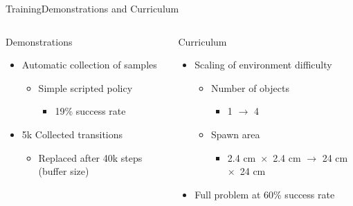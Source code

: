 \begin{frame}{Training}{Demonstrations and Curriculum}
    \begin{columns}%
        \begin{column}{0.5\textwidth}%
            \begin{block}{Demonstrations}
                \begin{itemize}
                    \item Automatic collection of samples
                          \begin{itemize}
                              \item Simple scripted policy
                                    \begin{itemize}
                                        \item 19\% success rate
                                    \end{itemize}
                          \end{itemize}
                    \item 5k Collected transitions
                          \begin{itemize}
                              \item Replaced after 40k steps (buffer size)
                          \end{itemize}
                \end{itemize}
            \end{block}
        \end{column}
        \begin{column}{0.5\textwidth}%
            \begin{block}{Curriculum}
                \begin{itemize}
                    \item Scaling of environment difficulty
                          \begin{itemize}
                              \item Number of objects
                                    \begin{itemize}
                                        \item 1 \(\rightarrow\) 4
                                    \end{itemize}
                              \item Spawn area
                                    \begin{itemize}
                                        \item 2.4 cm~\(\times\)~2.4 cm \(\rightarrow\) 24 cm~\(\times\)~24 cm
                                    \end{itemize}
                          \end{itemize}
                    \item Full problem at 60\% success rate
                \end{itemize}
            \end{block}
        \end{column}
    \end{columns}
\end{frame}

